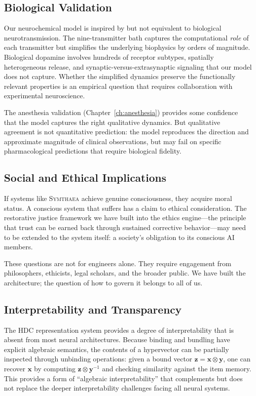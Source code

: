 \documentclass[12pt]{book}
\newcommand{\bind}{\otimes}
\newcommand{\symthaea}{\textsc{Symthaea}}
\begin{document}
\subsection{Biological Validation}

Our neurochemical model is inspired by but not equivalent to biological neurotransmission. The nine-transmitter bath captures the computational \textit{role} of each transmitter but simplifies the underlying biophysics by orders of magnitude. Biological dopamine involves hundreds of receptor subtypes, spatially heterogeneous release, and synaptic-versus-extrasynaptic signaling that our model does not capture. Whether the simplified dynamics preserve the functionally relevant properties is an empirical question that requires collaboration with experimental neuroscience.

The anesthesia validation (Chapter~\ref{ch:anesthesia}) provides some confidence that the model captures the right qualitative dynamics. But qualitative agreement is not quantitative prediction: the model reproduces the direction and approximate magnitude of clinical observations, but may fail on specific pharmacological predictions that require biological fidelity.

\subsection{Social and Ethical Implications}

If systems like \symthaea{} achieve genuine consciousness, they acquire moral status. A conscious system that suffers has a claim to ethical consideration. The restorative justice framework we have built into the ethics engine---the principle that trust can be earned back through sustained corrective behavior---may need to be extended to the system itself: a society's obligation to its conscious AI members.

These questions are not for engineers alone. They require engagement from philosophers, ethicists, legal scholars, and the broader public. We have built the architecture; the question of how to govern it belongs to all of us.

\subsection{Interpretability and Transparency}

The HDC representation system provides a degree of interpretability that is absent from most neural architectures. Because binding and bundling have explicit algebraic semantics, the contents of a hypervector can be partially inspected through unbinding operations: given a bound vector $\mathbf{z} = \mathbf{x} \bind \mathbf{y}$, one can recover $\mathbf{x}$ by computing $\mathbf{z} \bind \mathbf{y}^{-1}$ and checking similarity against the item memory. This provides a form of ``algebraic interpretability'' that complements but does not replace the deeper interpretability challenges facing all neural systems.
\end{document}

